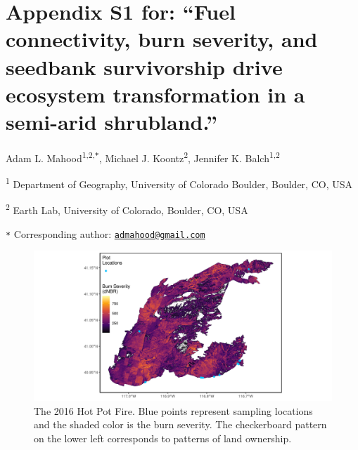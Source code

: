 \documentclass[
  12pt,
]{article}
\author{}
\date{\vspace{-2.5em}}
\begin{document}
\renewcommand{\thetable}{S\arabic{table}}      \setcounter{table}{0} \renewcommand{\thefigure}{S\arabic{figure}}

\hypertarget{appendix-s1-for-fuel-connectivity-burn-severity-and-seedbank-survivorship-drive-ecosystem-transformation-in-a-semi-arid-shrubland.}{%
\section{Appendix S1 for: ``Fuel connectivity, burn severity, and
seedbank survivorship drive ecosystem transformation in a semi-arid
shrubland.''}\label{appendix-s1-for-fuel-connectivity-burn-severity-and-seedbank-survivorship-drive-ecosystem-transformation-in-a-semi-arid-shrubland.}}

Adam L. Mahood\textsuperscript{1,2,\texttt{*}}, Michael J.
Koontz\textsuperscript{2}, Jennifer K. Balch\textsuperscript{1,2}

\small

\textsuperscript{1} Department of Geography, University of Colorado
Boulder, Boulder, CO, USA

\textsuperscript{2} Earth Lab, University of Colorado, Boulder, CO, USA

\texttt{*} Corresponding author:
\href{mailto:admahood@gmail.com}{\nolinkurl{admahood@gmail.com}}

\normalsize

\newpage

\begin{figure}
\centering
\includegraphics{images/map.png}
\caption{The 2016 Hot Pot Fire. Blue points represent sampling locations
and the shaded color is the burn severity. The checkerboard pattern on
the lower left corresponds to patterns of land ownership.}
\end{figure}

\newpage
\end{document}
